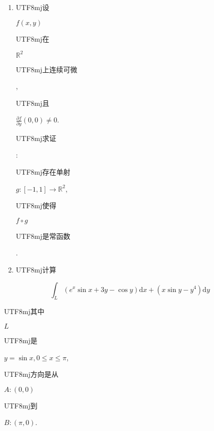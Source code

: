 \documentclass[10pt]{article}
\begin{document}
\begin{enumerate}
  \item \begin{CJK}{UTF8}{mj}设\end{CJK} $f(x, y)$ \begin{CJK}{UTF8}{mj}在\end{CJK} $\mathbb{R}^{2}$ \begin{CJK}{UTF8}{mj}上连续可微\end{CJK}, \begin{CJK}{UTF8}{mj}且\end{CJK} $\frac{\partial f}{\partial y}(0,0) \neq 0$. \begin{CJK}{UTF8}{mj}求证\end{CJK}: \begin{CJK}{UTF8}{mj}存在单射\end{CJK} $g:[-1,1] \rightarrow \mathbb{R}^{2}$, \begin{CJK}{UTF8}{mj}使得\end{CJK} $f \circ g$ \begin{CJK}{UTF8}{mj}是常函数\end{CJK}.

  \item \begin{CJK}{UTF8}{mj}计算\end{CJK}

\end{enumerate}
$$
\int_{L}\left(e^{x} \sin x+3 y-\cos y\right) \mathrm{d} x+\left(x \sin y-y^{4}\right) \mathrm{d} y
$$
\begin{CJK}{UTF8}{mj}其中\end{CJK} $L$ \begin{CJK}{UTF8}{mj}是\end{CJK} $y=\sin x, 0 \leqslant x \leqslant \pi$, \begin{CJK}{UTF8}{mj}方向是从\end{CJK} $A:(0,0)$ \begin{CJK}{UTF8}{mj}到\end{CJK} $B:(\pi, 0)$.
\end{document}
